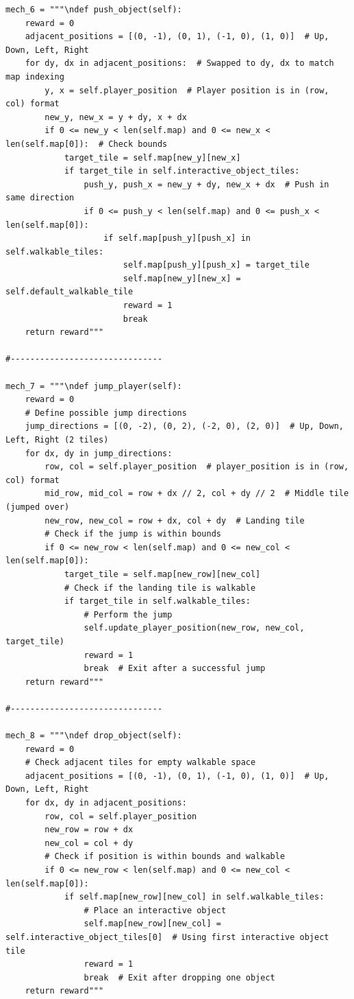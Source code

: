 \documentclass{article} %
\begin{document}
\begin{lstlisting}
mech_6 = """\ndef push_object(self):
    reward = 0
    adjacent_positions = [(0, -1), (0, 1), (-1, 0), (1, 0)]  # Up, Down, Left, Right
    for dy, dx in adjacent_positions:  # Swapped to dy, dx to match map indexing
        y, x = self.player_position  # Player position is in (row, col) format
        new_y, new_x = y + dy, x + dx
        if 0 <= new_y < len(self.map) and 0 <= new_x < len(self.map[0]):  # Check bounds
            target_tile = self.map[new_y][new_x]
            if target_tile in self.interactive_object_tiles:
                push_y, push_x = new_y + dy, new_x + dx  # Push in same direction
                if 0 <= push_y < len(self.map) and 0 <= push_x < len(self.map[0]):
                    if self.map[push_y][push_x] in self.walkable_tiles:
                        self.map[push_y][push_x] = target_tile
                        self.map[new_y][new_x] = self.default_walkable_tile
                        reward = 1
                        break
    return reward"""

#------------------------------- 

mech_7 = """\ndef jump_player(self):
    reward = 0
    # Define possible jump directions
    jump_directions = [(0, -2), (0, 2), (-2, 0), (2, 0)]  # Up, Down, Left, Right (2 tiles)
    for dx, dy in jump_directions:
        row, col = self.player_position  # player_position is in (row, col) format
        mid_row, mid_col = row + dx // 2, col + dy // 2  # Middle tile (jumped over)
        new_row, new_col = row + dx, col + dy  # Landing tile
        # Check if the jump is within bounds
        if 0 <= new_row < len(self.map) and 0 <= new_col < len(self.map[0]):
            target_tile = self.map[new_row][new_col]
            # Check if the landing tile is walkable
            if target_tile in self.walkable_tiles:
                # Perform the jump
                self.update_player_position(new_row, new_col, target_tile)
                reward = 1
                break  # Exit after a successful jump
    return reward"""

#------------------------------- 

mech_8 = """\ndef drop_object(self):
    reward = 0
    # Check adjacent tiles for empty walkable space
    adjacent_positions = [(0, -1), (0, 1), (-1, 0), (1, 0)]  # Up, Down, Left, Right
    for dx, dy in adjacent_positions:
        row, col = self.player_position
        new_row = row + dx
        new_col = col + dy
        # Check if position is within bounds and walkable
        if 0 <= new_row < len(self.map) and 0 <= new_col < len(self.map[0]):
            if self.map[new_row][new_col] in self.walkable_tiles:
                # Place an interactive object
                self.map[new_row][new_col] = self.interactive_object_tiles[0]  # Using first interactive object tile
                reward = 1
                break  # Exit after dropping one object        
    return reward"""


\end{lstlisting}
\end{document}
